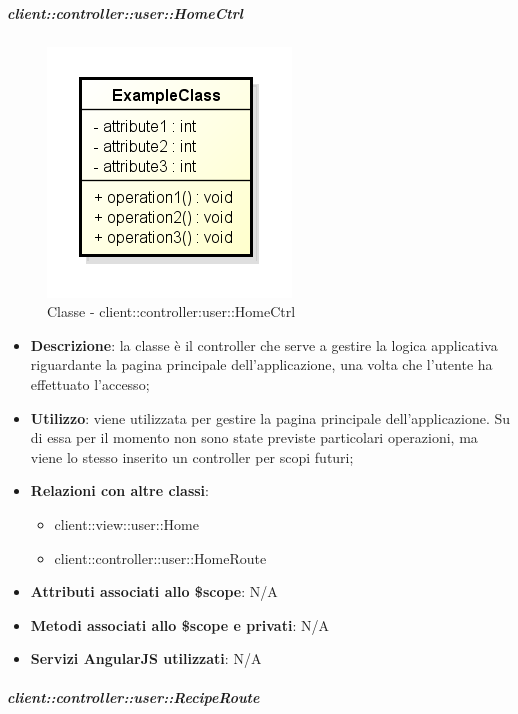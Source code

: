 		\subparagraph{client::controller::user::HomeCtrl} %
		\label{subp:client_controller_user_homectrl}
			\begin{figure}[htbp]
				\centering
				\centerline{\includegraphics[scale=0.7]{./images/client/classes/example_class.png}}
				\caption{Classe - client::controller:user::HomeCtrl}
			\end{figure}
			\begin{itemize}
				\item \textbf{Descrizione}: la classe è il controller che serve a gestire la logica applicativa riguardante la pagina principale dell'applicazione, una volta che l'utente ha effettuato l'accesso;
				\item \textbf{Utilizzo}: viene utilizzata per gestire la pagina principale dell'applicazione. Su di essa per il momento non sono state previste particolari operazioni, ma viene lo stesso inserito un controller per scopi futuri;
				\item \textbf{Relazioni con altre classi}:
					\begin{itemize}
						\item client::view::user::Home
						\item client::controller::user::HomeRoute
					\end{itemize}

				\item \textbf{Attributi associati allo \$scope}: N/A
				\item \textbf{Metodi associati allo \$scope e privati}: N/A
				\item \textbf{Servizi AngularJS utilizzati}: N/A

			\end{itemize}

		\subparagraph{client::controller::user::RecipeRoute} %
		\label{subp:bdsm_app_client_controller_user_reciperouteconfig}

